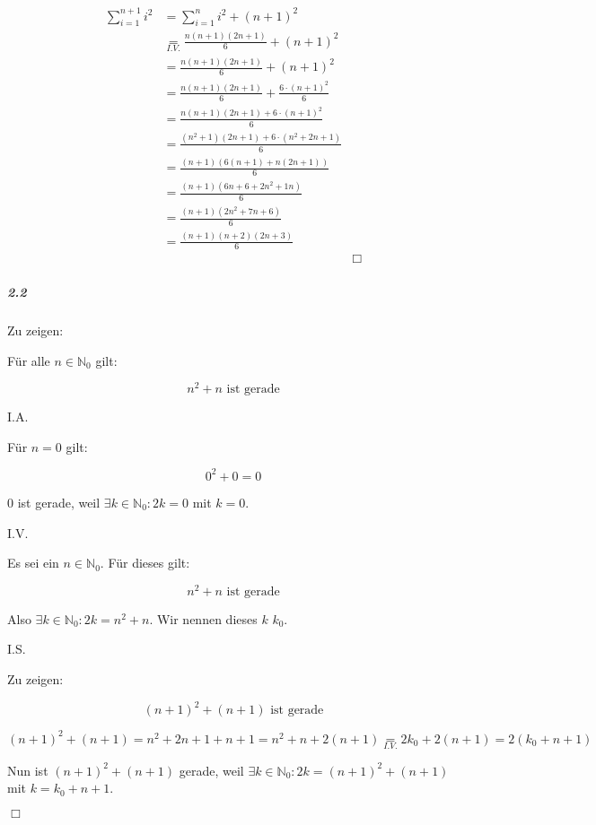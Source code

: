 \documentclass[a4paper,12pt]{article}
\begin{document}
$$\begin{aligned}
        \sum_{i=1}^{n+1} i^2
         & =\sum_{i=1}^n i^2 + (n+1)^2                             \\
         & \underset{I.V.}{=}\frac{n(n+1)(2n+1)}{6}+(n+1)^2        \\
         & =\frac{n(n+1)(2n+1)}{6}+(n+1)^2                         \\
         & =\frac{n(n+1)(2n+1)}{6}+\frac{6\cdot(n+1)^2}{6}         \\
         & =\frac{n(n+1)(2n+1)+6\cdot(n+1)^2}{6}                   \\
         & =\frac{(n^2+1)(2n+1)+6\cdot(n^2+2n+1)}{6}               \\
         & =\frac{(n+1)(6(n+1)+n(2n+1))}{6}                        \\
         & =\frac{(n+1)(6n+6+2n^2+1n)}{6}                          \\
         & =\frac{(n+1)(2n^2+7n+6)}{6}                             \\
         & =\frac{(n+1)(n+2)(2n+3)}{6}                             \\
         &                                                  & \Box
    \end{aligned}$$

\subparagraph{2.2}

Zu zeigen:

Für alle $n\in\mathbb{N}_0$ gilt:

$$n^2+n\text{ ist gerade}$$

I.A.

Für $n=0$ gilt:

$$0^2+0=0$$

$0$ ist gerade, weil $\exists k\in\mathbb{N}_0: 2k=0$ mit $k=0$.

I.V.

Es sei ein $n\in\mathbb{N}_0$. Für dieses gilt:

$$n^2+n\text{ ist gerade}$$

Also $\exists k\in\mathbb{N}_0: 2k=n^2+n$. Wir nennen dieses $k$ $k_0$.

I.S.

Zu zeigen:

$$(n+1)^2+(n+1)\text{ ist gerade}$$

$$(n+1)^2+(n+1)=n^2+2n+1+n+1=n^2+n+2(n+1)\underset{I.V.}{=}2k_0+2(n+1)=2(k_0+n+1)$$

Nun ist $(n+1)^2+(n+1)$ gerade, weil $\exists k\in\mathbb{N}_0: 2k=(n+1)^2+(n+1)$ mit $k=k_0+n+1$.

$\Box$
\end{document}
